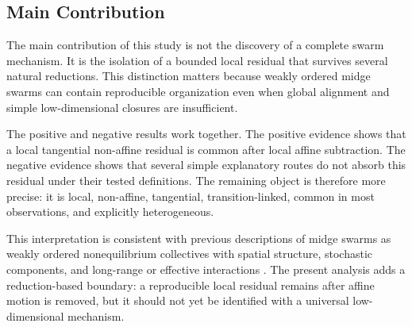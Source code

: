 \subsection{Main Contribution}

The main contribution of this study is not the discovery of a complete swarm
mechanism. It is the isolation of a bounded local residual that survives
several natural reductions. This distinction matters because weakly ordered
midge swarms can contain reproducible organization even when global alignment
and simple low-dimensional closures are insufficient.

The positive and negative results work together. The positive evidence shows
that a local tangential non-affine residual is common after local affine
subtraction. The negative evidence shows that several simple explanatory
routes do not absorb this residual under their tested definitions. The
remaining object is therefore more precise: it is local, non-affine,
tangential, transition-linked, common in most observations, and explicitly
heterogeneous.

This interpretation is consistent with previous descriptions of midge swarms
as weakly ordered nonequilibrium collectives with spatial structure,
stochastic components, and long-range or effective interactions
\cite{feng2023_sampling,reynolds2017_velocity_gravity,reynolds2018_langevin,reynolds2021_intrinsic,reynolds2024_spatial,sinhuber2021_eos}.
The present analysis adds a reduction-based boundary: a reproducible local
residual remains after affine motion is removed, but it should not yet be
identified with a universal low-dimensional mechanism.

